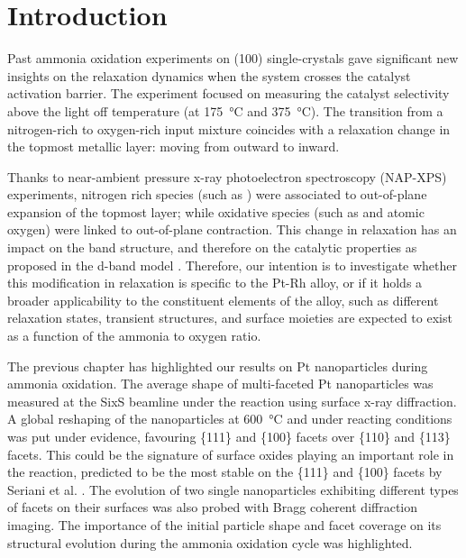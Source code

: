 \section{Introduction}

Past ammonia oxidation experiments on  (100) \parencite{Resta2020a} single-crystals gave significant new insights on the relaxation dynamics when the system crosses the catalyst activation barrier.
The experiment focused on measuring the catalyst selectivity above the light off temperature (at \qty{175}{\degreeCelsius} and \qty{375}{\degreeCelsius}).
The transition from a nitrogen-rich to oxygen-rich input mixture coincides with a relaxation change in the topmost metallic layer: moving from outward to inward.

Thanks to near-ambient pressure x-ray photoelectron spectroscopy (NAP-XPS) experiments, nitrogen rich species (such as ) were associated to out-of-plane expansion of the topmost layer; while oxidative species (such as  and atomic oxygen) were linked to out-of-plane contraction.
This change in relaxation has an impact on the band structure, and therefore on the catalytic properties as proposed in the d-band model \parencite{Mavrikakis1998}.
Therefore, our intention is to investigate whether this modification in relaxation is specific to the Pt-Rh alloy, or if it holds a broader applicability to the constituent elements of the alloy, such as different relaxation states, transient structures, and surface moieties are expected to exist as a function of the ammonia to oxygen ratio.

The previous chapter has highlighted our results on Pt nanoparticles during ammonia oxidation.
The average shape of multi-faceted Pt nanoparticles was measured at the SixS beamline under the reaction using surface x-ray diffraction.
A global reshaping of the nanoparticles at \qty{600}{\degreeCelsius} and under reacting conditions was put under evidence, favouring \{111\} and \{100\} facets over \{110\} and \{113\} facets.
This could be the signature of surface oxides playing an important role in the reaction, predicted to be the most stable on the \{111\} and \{100\} facets by Seriani et al. \parencite*{Seriani2008}.
The evolution of two single nanoparticles exhibiting different types of facets on their surfaces was also probed with Bragg coherent diffraction imaging.
The importance of the initial particle shape and facet coverage on its structural evolution during the ammonia oxidation cycle was highlighted.

